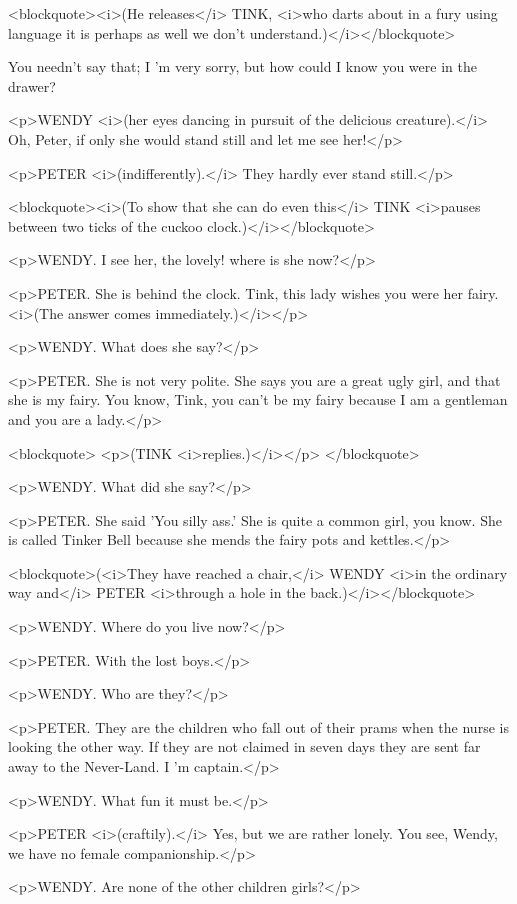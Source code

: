 <blockquote><i>(He releases</i> TINK, <i>who darts about in a fury
using language it is perhaps as well we don't
understand.)</i></blockquote>

You needn't say that; I 'm very sorry, but how could I know you were
in the drawer? 

<p>WENDY <i>(her eyes dancing in pursuit of the delicious
creature).</i> Oh, Peter, if only she would stand still and let me
see her!</p>

<p>PETER <i>(indifferently).</i> They hardly ever stand still.</p>

<blockquote><i>(To show that she can do even this</i> TINK <i>pauses
between two ticks of the cuckoo clock.)</i></blockquote>

<p>WENDY. I see her, the lovely! where is she now?</p>

<p>PETER. She is behind the clock. Tink, this lady wishes you were
her fairy. <i>(The answer comes immediately.)</i></p>

<p>WENDY. What does she say?</p>

<p>PETER. She is not very polite. She says you are a great ugly girl,
and that she is my fairy. You know, Tink, you can't be my fairy
because I am a gentleman and you are a lady.</p>

<blockquote>
<p>(TINK <i>replies.)</i></p>
</blockquote>

<p>WENDY. What did she say?</p>

<p>PETER. She said 'You silly ass.' She is quite a common girl, you
know. She is called Tinker Bell because she mends the fairy pots and
kettles.</p>

<blockquote>(<i>They have reached a chair,</i> WENDY <i>in the
ordinary way and</i> PETER <i>through a hole in the
back.)</i></blockquote>

<p>WENDY. Where do you live now?</p>

<p>PETER. With the lost boys.</p>

<p>WENDY. Who are they?</p>

<p>PETER. They are the children who fall out of their prams when the
nurse is looking the other way. If they are not claimed in seven days
they are sent far away to the Never-Land. I 'm captain.</p>

<p>WENDY. What fun it must be.</p>

<p>PETER <i>(craftily).</i> Yes, but we are rather lonely. You see,
Wendy, we have no female companionship.</p>

<p>WENDY. Are none of the other children girls?</p>

